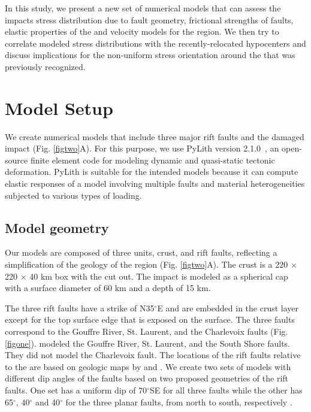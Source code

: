 \documentclass[draft]{agujournal2018}
\begin{document}
In this study, we present a new set of numerical models that can assess the impacts  stress distribution due to fault geometry, frictional strengths of faults, elastic properties of the  and velocity models for the region. We then try to correlate modeled stress distributions with the recently-relocated hypocenters \citep{Powell_2017} and discuss implications for the non-uniform stress orientation around the  that was previously recognized.

\section{Model Setup}
We create numerical models that include three major rift faults and the damaged impact  (Fig. \ref{figtwo}A). For this purpose, we use PyLith version 2.1.0~\citep{Aagard2015, matthew2015, c2015}, an open-source finite element code for modeling dynamic and quasi-static tectonic deformation. PyLith is suitable for the intended models because it can compute elastic responses of a model involving multiple faults and material heterogeneities subjected to various types of loading.

\subsection{Model geometry}
Our models are composed of three units, crust,  and rift faults, reflecting a simplification of the geology of the region (Fig. \ref{figtwo}A). The crust is a 220 $\times$ 220 $\times$ 40 km box with the  cut out. The impact  is modeled as a spherical cap with a surface diameter of 60 km and a depth of 15 km. 

The three rift faults have a strike of N35$^\circ$E and are embedded in the crust layer except for the top surface edge that is exposed on the surface. The three faults correspond to the Gouffre  River, St. Laurent, and the Charlevoix faults (Fig. \ref{figone}). \citet{Baird_2010} modeled the Gouffre River, St. Laurent, and the South Shore faults. They did not model the Charlevoix fault. The locations of the rift faults relative to the  are based on geologic maps by \citet{lamontagne1999} and \citet{Rondot_1971}. We create two sets of models with different dip angles of the faults based on two proposed geometries of the rift faults. One set has a uniform dip of 70$^\circ$SE for all three faults \citep{anglin1984,Baird_2010} while the other has 65$^\circ$, 40$^\circ$ and 40$^\circ$ for the three planar faults, from north to south, respectively \citep{Powell_2017}. 
\end{document}
